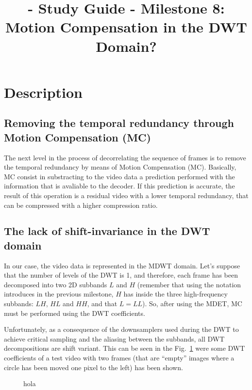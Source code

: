 
\title{\SM{} - Study Guide - Milestone 8: Motion Compensation in the DWT Domain?}

\maketitle

\section{Description}

\subsection{Removing the temporal redundancy through Motion Compensation (MC)}
The next level in the process of decorrelating the sequence of frames
is to remove the temporal redundancy by means of Motion Compensation
(MC). Basically, MC consist in substracting to the video data a
prediction performed with the information that is avaliable to the
decoder. If this prediction is accurate, the result of this operation
is a residual video with a lower temporal redundancy, that can be
compressed with a higher compression ratio.

\subsection{The lack of shift-invariance in the DWT domain}
In our case, the video data is represented in the MDWT domain. Let's
suppose that the number of levels of the DWT is 1, and therefore, each
frame has been decomposed into two 2D subbands $L$ and $H$ (remember
that using the notation introduces in the previous milestone, $H$ has
inside the three high-frequency subbands: $LH$, $HL$ and $HH$, and
that $L=LL$). So, after using the MDET, MC must be performed using the
DWT coefficients.

Unfortunately, as a consequence of the downsamplers used during the
DWT to achieve critical sampling and the aliasing between the
subbands, all DWT decompositions are shift variant. This can be seen
in the Fig.~\ref{fig:dwt_shift_variance} were some DWT coefficients of a
test video with two frames (that are ``empty'' images where a circle
has been moved one pixel to the left) has been shown.

\begin{figure}
  \centering
  \caption{hola}
\label{fig:dwt_shift_variance}
\end{figure}

